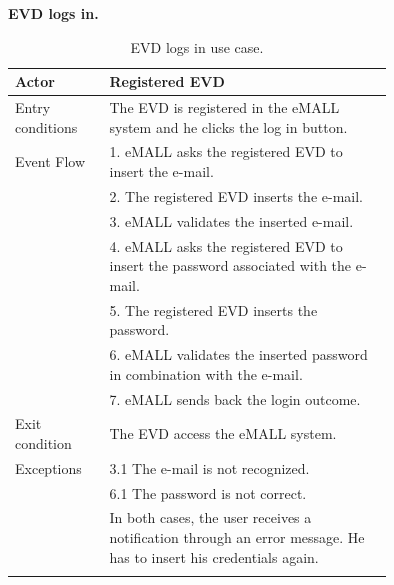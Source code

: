 \textbf{EVD logs in.}
\begin{center}
    \begin{longtable}{lp{0.75\linewidth}}
        \hline
        Actor            & Registered EVD                                                                                                    \\
        \hline
        Entry conditions & The EVD is registered in the eMALL system and he clicks the log in button.                                        \\
        \hline
        Event Flow       & 1. eMALL asks the registered EVD to insert the e-mail.                                                            \\
        & 2. The registered EVD inserts the e-mail.                                                                         \\
        & 3. eMALL validates the inserted e-mail.                                                                           \\
        & 4. eMALL asks the registered EVD to insert the password associated with the e-mail.                               \\
        & 5. The registered EVD inserts the password.                                                                       \\
        & 6. eMALL validates the inserted password in combination with the e-mail.                                          \\
        & 7. eMALL sends back the login outcome.                                                                            \\
        \hline
        Exit condition   & The EVD access the eMALL system.                                                                                  \\
        \hline
        Exceptions       & 3.1 The e-mail is not recognized.                                                                                 \\
        & 6.1 The password is not correct.                                                                                  \\
        & In both cases, the user receives a notification through an error message. He has to insert his credentials again. \\
        \hline
        \caption{EVD logs in use case.}
        \label{tab: EVD_logs_in_use_case}
    \end{longtable}
\end{center}

